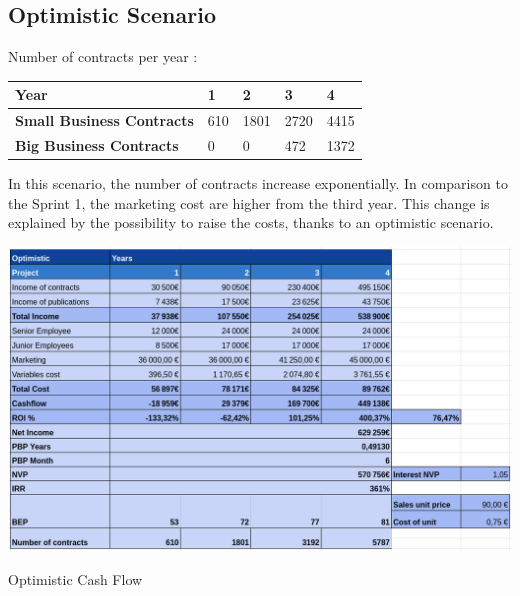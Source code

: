 \documentclass[./main.tex]{subfiles}
\begin{document}
\subsection{Optimistic Scenario}
Number of contracts per year : 
\begin{table}[H]
	\centering
\begin{tabular}{|l|l|l|l|l|}
\hline
\textbf{Year}                     & 1  & 2   & 3   & 4   \\ \hline
\textbf{Small Business Contracts} & 610 & 1801 & 2720 & 4415 \\ \hline
\textbf{Big Business Contracts}   & 0  & 0   & 472  & 1372 \\ \hline
\end{tabular}
\end{table}
In this scenario, the number of contracts increase exponentially. 
In comparison to the Sprint 1, the marketing cost are higher from the third year. This change is explained by the possibility to raise the costs, thanks to an optimistic scenario.
\begin{table}[H]
	\centering
	\includegraphics[width=14cm]{img/optimistic.png}
	\caption{Optimistic Cash Flow}
	\label{tab:optimistic}
\end{table}
\end{document}

